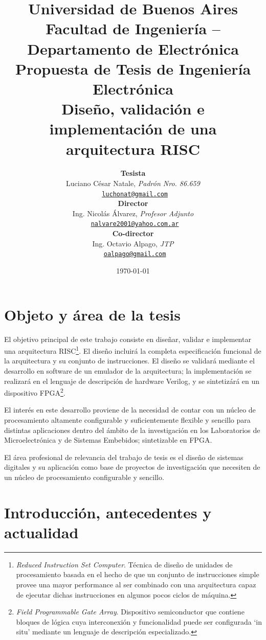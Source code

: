 \documentclass[a4paper]{article}
\title{
	{\normalsize
		Universidad de Buenos Aires\\
		Facultad de Ingeniería -- Departamento de Electrónica\\
		Propuesta de Tesis de Ingeniería Electrónica\\
		\vspace{0.7cm}
	}
	Diseño, validación e implementación de una arquitectura RISC
}
\author{	\textbf{Tesista}															\\
			Luciano César Natale, \textit{Padrón Nro. 86.659}               			\\
            \texttt{ \href{mailto:luchonat@gmail.com}{luchonat@gmail.com}}			\\[2.5ex]
            \textbf{Director}																\\
            Ing. Nicolás Álvarez, \textit{Profesor Adjunto}             				\\
            \texttt{ \href{mailto:nalvare2001@yahoo.com.ar}{nalvare2001@yahoo.com.ar}}  \\[2.5ex]
            \textbf{Co-director}															\\
            Ing. Octavio Alpago, \textit{JTP}               					\\
            \texttt{ \href{mailto:oalpago@gmail.com}{oalpago@gmail.com}}                \\[2.5ex]
       }
\date{\today}
\begin{document}
\maketitle



\thispagestyle{fancy}

\section{Objeto y área de la tesis}

El objetivo principal de este trabajo consiste en diseñar, validar e implementar una arquitectura RISC\footnote{\label{RISC} \emph{Reduced Instruction Set Computer}. Técnica de diseño de unidades de procesamiento basada en el hecho de que un conjunto de instrucciones simple provee una mayor performance al ser combinado con una arquitectura capaz de ejecutar dichas instrucciones en algunos pocos ciclos de máquina.}. El diseño incluirá la completa especificación funcional de la arquitectura y su conjunto de instrucciones. El diseño se validará mediante el desarrollo en software de un emulador de la arquitectura; la implementación se realizará en el lenguaje de descripción de hardware Verilog, y se sintetizárá en un dispositivo FPGA\footnote{\label{FPGA} \emph{Field Programmable Gate Array}. Dispositivo semiconductor que contiene bloques de lógica cuya interconexión y funcionalidad puede ser configurada `in situ' mediante un lenguaje de descripción especializado.}.

El interés en este desarrollo proviene de la necesidad de contar con un núcleo de procesamiento altamente configurable y suficientemente flexible y sencillo para distintas aplicaciones dentro del ámbito de la investigación en los Laboratorios de Microelectrónica y de Sistemas Embebidos; sintetizable en FPGA.

El área profesional de relevancia del trabajo de tesis es el diseño de sistemas digitales y su aplicación como base de proyectos de investigación que necesiten de un núcleo de procesamiento configurable y sencillo.

\newpage

\section{Introducción, antecedentes y actualidad}
\end{document}

